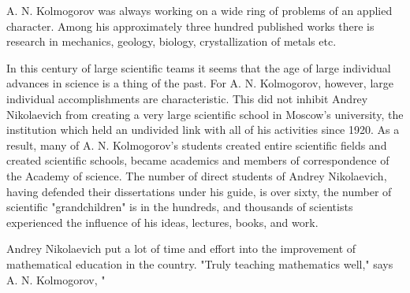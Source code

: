 \documentclass{article}
\begin{document}
A. N. Kolmogorov was always working on a wide ring of problems of an applied character.
Among his approximately three hundred published works there is research in mechanics, geology, biology, crystallization of metals etc.

In this century of large scientific teams it seems that the age of large individual advances in science is a thing of the past.
For A. N. Kolmogorov, however, large individual accomplishments are characteristic.
This did not inhibit Andrey Nikolaevich from creating a very large scientific school in Moscow's university, the institution which held an undivided link with all of his activities since 1920.
As a result, many of A. N. Kolmogorov's students created entire scientific fields and created scientific schools, became academics and members of correspondence of the Academy of science.
The number of direct students of Andrey Nikolaevich, having defended their dissertations under his guide, is over sixty, the number of scientific "grandchildren" is in the hundreds, and thousands of scientists experienced the influence of his ideas, lectures, books, and work.

Andrey Nikolaevich put a lot of time and effort into the improvement of mathematical education in the country.
"Truly teaching mathematics well," says A. N. Kolmogorov, "
\end{document}
